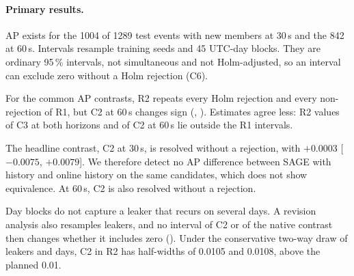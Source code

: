 \paragraph{Primary results.}
AP exists for the \num{1004} of \num{1289} test events with new members at 30\,s and the 842 at 60\,s.
Intervals resample training seeds and 45 UTC-day blocks.
They are ordinary 95\,\% intervals, not simultaneous and not Holm-adjusted, so an interval can exclude zero without a Holm rejection (C6).

For the common AP contrasts, R2 repeats every Holm rejection and every non-rejection of R1, but C2 at 60\,s changes sign (, ).
Estimates agree less: R2 values of C3 at both horizons and of C2 at 60\,s lie outside the R1 intervals.

The headline contrast, C2 at 30\,s, is resolved without a rejection, with $+0.0003$ [$-0.0075$, $+0.0079$].
We therefore detect no AP difference between SAGE with history and online history on the same candidates, which does not show equivalence.
At 60\,s, C2 is also resolved without a rejection.

Day blocks do not capture a leaker that recurs on several days.
A revision analysis also resamples leakers, and no interval of C2 or of the native contrast then changes whether it includes zero ().
Under the conservative two-way draw of leakers and days, C2 in R2 has half-widths of 0.0105 and 0.0108, above the planned 0.01.

